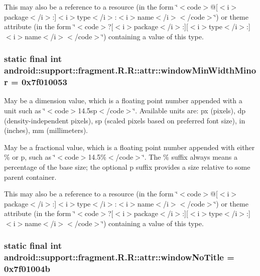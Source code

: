 This may also be a reference to a resource (in the form \char`\"{}$<$code$>$@\mbox{[}$<$i$>$package$<$/i$>$:\mbox{]}$<$i$>$type$<$/i$>$:$<$i$>$name$<$/i$>$$<$/code$>$\char`\"{}) or theme attribute (in the form \char`\"{}$<$code$>$?\mbox{[}$<$i$>$package$<$/i$>$:\mbox{]}\mbox{[}$<$i$>$type$<$/i$>$:\mbox{]}$<$i$>$name$<$/i$>$$<$/code$>$\char`\"{}) containing a value of this type. \hypertarget{classandroid_1_1support_1_1fragment_1_1_r_1_1attr_9a03cf8abc4025e5be3c00693de1ed38}{
\subsubsection[{windowMinWidthMinor}]{\setlength{\rightskip}{0pt plus 5cm}static final int android::support::fragment.R.R::attr::windowMinWidthMinor = 0x7f010053}}
\label{classandroid_1_1support_1_1fragment_1_1_r_1_1attr_9a03cf8abc4025e5be3c00693de1ed38}


May be a dimension value, which is a floating point number appended with a unit such as \char`\"{}$<$code$>$14.5sp$<$/code$>$\char`\"{}. Available units are: px (pixels), dp (density-independent pixels), sp (scaled pixels based on preferred font size), in (inches), mm (millimeters). 

May be a fractional value, which is a floating point number appended with either \% or p, such as \char`\"{}$<$code$>$14.5\%$<$/code$>$\char`\"{}. The \% suffix always means a percentage of the base size; the optional p suffix provides a size relative to some parent container. 

This may also be a reference to a resource (in the form \char`\"{}$<$code$>$@\mbox{[}$<$i$>$package$<$/i$>$:\mbox{]}$<$i$>$type$<$/i$>$:$<$i$>$name$<$/i$>$$<$/code$>$\char`\"{}) or theme attribute (in the form \char`\"{}$<$code$>$?\mbox{[}$<$i$>$package$<$/i$>$:\mbox{]}\mbox{[}$<$i$>$type$<$/i$>$:\mbox{]}$<$i$>$name$<$/i$>$$<$/code$>$\char`\"{}) containing a value of this type. \hypertarget{classandroid_1_1support_1_1fragment_1_1_r_1_1attr_767b62ae1c0eae55cc723f3e95526231}{
\subsubsection[{windowNoTitle}]{\setlength{\rightskip}{0pt plus 5cm}static final int android::support::fragment.R.R::attr::windowNoTitle = 0x7f01004b}}
\label{classandroid_1_1support_1_1fragment_1_1_r_1_1attr_767b62ae1c0eae55cc723f3e95526231}


